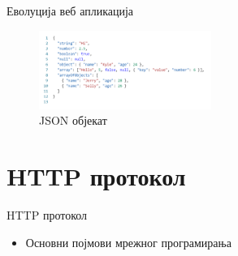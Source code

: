 \documentclass{beamer}
\begin{document}
\begin{frame}[allowframebreaks]{Еволуција веб апликација}
        \framebreak
        
        \begin{figure}
            \centering
            \includegraphics[width=0.5\textwidth]{images/json.png}
            \caption{JSON објекат}
            \label{fig:json}
        \end{figure}
    \end{frame}
    
    \section{HTTP протокол}
    
    \begin{frame}{HTTP протокол}
        \begin{itemize}
            \item Основни појмови мрежног програмирања
        \end{itemize}
    \end{frame}
\end{document}
